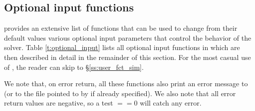 
\subsection{Optional input functions}\label{ss:optional_input}

{\cvode} provides an extensive list of functions that can be used to change
from their default values various optional input parameters that control the
behavior of the {\cvode} solver. 
Table \ref{t:optional_input} lists all optional input functions in {\cvode} which 
are then described in detail in the remainder of this section.
For the most casual use of {\cvode}, the reader can skip to \S\ref{ss:user_fct_sim}.

We note that, on error return, all these functions also print an error message to  
(or to the file pointed to by  if already specified).
We also note that all error return values are negative, so a test $==0$
will catch any error.

